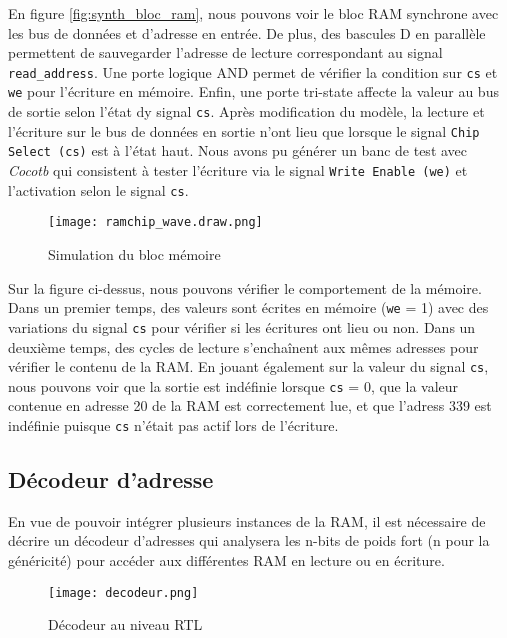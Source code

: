 \indent En figure \ref{fig:synth_bloc_ram}, nous pouvons voir le bloc RAM synchrone avec les bus de données et d'adresse en entrée.
De plus, des bascules D en parallèle permettent de sauvegarder l'adresse de lecture correspondant au signal \texttt{read\_address}.
Une porte logique AND permet de vérifier la condition sur \texttt{cs} et \texttt{we} pour l'écriture en mémoire.
Enfin, une porte tri-state affecte la valeur au bus de sortie selon l'état dy signal \texttt{cs}.
\indent Après modification du modèle, la lecture et l'écriture sur le bus de données en sortie n'ont lieu que lorsque le signal \texttt{Chip Select (cs)} est à l'état haut.
Nous avons pu générer un banc de test avec \textit{Cocotb} qui consistent à tester l'écriture via le signal \texttt{Write Enable (we)} et l'activation selon le signal \texttt{cs}.

\begin{figure}[h]
	\centering
	\texttt{[image: ramchip\_wave.draw.png]}
	\caption{Simulation du bloc mémoire}
	\label{fig:wave_bloc_ram}
\end{figure}

\indent Sur la figure ci-dessus, nous pouvons vérifier le comportement de la mémoire.
Dans un premier temps, des valeurs sont écrites en mémoire (\texttt{we} = 1) avec des variations du signal \texttt{cs} pour vérifier si les écritures ont lieu ou non.
Dans un deuxième temps, des cycles de lecture s'enchaînent aux mêmes adresses pour vérifier le contenu de la \gls{RAM}.
En jouant également sur la valeur du signal \texttt{cs}, nous pouvons voir que la sortie est indéfinie lorsque \texttt{cs} = 0, que la valeur contenue en adresse 20 de la \gls{RAM} est correctement lue, et que l'adress 339 est indéfinie puisque \texttt{cs} n'était pas actif lors de l'écriture.

\newpage

\subsection{Décodeur d'adresse}

\indent En vue de pouvoir intégrer plusieurs instances de la \gls{RAM}, il est nécessaire de décrire un décodeur d'adresses qui analysera les n-bits de poids fort (n pour la généricité) pour accéder aux différentes \gls{RAM} en lecture ou en écriture.

\begin{figure}[h]
	\centering
	\texttt{[image: decodeur.png]}
	\caption{Décodeur au niveau RTL}
	\label{fig:synth_bloc_decodeur}
\end{figure}

